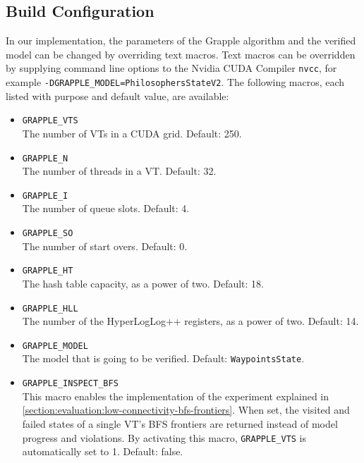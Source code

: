\documentclass[
fancyheadings, %
%
%
]{stsreprt}
\begin{document}

\subsection{Build Configuration}
\label{section:implementation:build-configuration}

In our implementation, the parameters of the Grapple algorithm and the verified model can be changed by overriding text macros.
Text macros can be overridden by supplying command line options to the Nvidia CUDA Compiler \texttt{nvcc}, for example \mbox{\texttt{-DGRAPPLE\_MODEL=PhilosophersStateV2}}.
The following macros, each listed with purpose and default value, are available:

\begin{itemize}
    \item \texttt{GRAPPLE\_VTS} \\
          The number of VTs in a CUDA grid.
          Default: 250.

    \item \texttt{GRAPPLE\_N} \\
          The number of threads in a VT.
          Default: 32.

    \item \texttt{GRAPPLE\_I} \\
          The number of queue slots.
          Default: 4.

    \item \texttt{GRAPPLE\_SO} \\
          The number of start overs.
          Default: 0.

    \item \texttt{GRAPPLE\_HT} \\
          The hash table capacity, as a power of two.
          Default: 18.

    \item \texttt{GRAPPLE\_HLL} \\
          The number of the HyperLogLog++ registers, as a power of two.
          Default: 14.

    \item \texttt{GRAPPLE\_MODEL} \\
          The model that is going to be verified.
          Default: \texttt{WaypointsState}.

    \item \texttt{GRAPPLE\_INSPECT\_BFS} \\
          This macro enables the implementation of the experiment explained in \cref{section:evaluation:low-connectivity-bfs-frontiers}.
          When set, the visited and failed states of a single VT's BFS frontiers are returned instead of model progress and violations.
          By activating this macro, \texttt{GRAPPLE\_VTS} is automatically set to 1.
          Default: false.
\end{itemize}
\end{document}
